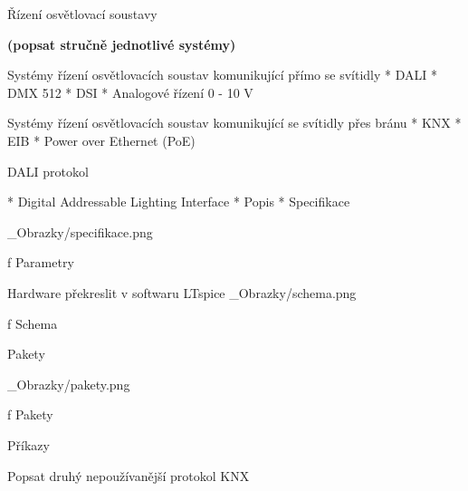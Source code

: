 \chap Řízení osvětlovací soustavy

{\bf (popsat stručně jednotlivé systémy)}

\medskip
Systémy řízení osvětlovacích soustav komunikující přímo se svítidly
\medskip
\begitems
    * DALI
    * DMX 512
    * DSI
    * Analogové řízení 0 - 10 V
\enditems

\medskip
Systémy řízení osvětlovacích soustav komunikující se svítidly přes bránu
\begitems
    * KNX 
    * EIB
    * Power over Ethernet (PoE)
\enditems

\sec DALI protokol








\begitems
    * Digital Addressable Lighting Interface
\medskip
    * Popis
\medskip
    * Specifikace
\enditems

\medskip {}
\picw=12cm _Obrazky/specifikace.png
\caption/f Parametry
\medskip

\secc Hardware překreslit v softwaru LTspice
\medskip {}
\picw=15cm _Obrazky/schema.png
\caption/f Schema
\medskip

\secc Pakety

\medskip {}
\picw=15cm _Obrazky/pakety.png
\caption/f Pakety
\medskip

\secc Příkazy

\secc Popsat druhý nepoužívanější protokol KNX